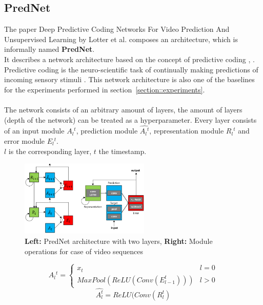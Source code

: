  \subsection{PredNet}
  The paper \glqq Deep Predictive Coding Networks For Video Prediction And Unsupervised Learning\grqq{} by Lotter et al. \cite{Lotter2016} composes an architecture, which is informally named
  \textbf{PredNet}.\\
  It describes a network architecture based on the concept of \glqq predictive coding\grqq{} \cite{Rao1999}, \cite{Friston2005}.
  Predictive coding is the neuro-scientific task of \glqq continually making predictions of incoming sensory stimuli\grqq{} \cite{Lotter2016}.
  This network architecture is also one of the baselines for the experiments performed in section~\ref{section::experiments}.
  \\\\  
  The network consists of an arbitrary amount of layers, the amount of layers (depth of the network) can be treated as a hyperparameter. Every layer consists
  of an input module $A{_l}^t$, prediction module $\hat{A{_l}^t}$, representation module $R{_l}^t$ and error module $E{_l}^t$.\\
  $l$ is the corresponding layer, $t$ the timestamp.
  \begin{figure}[H]
   \includegraphics[width=0.55\textwidth]{../Images/lotter.png}
   \centering
   \caption{\textbf{Left:} PredNet architecture with two layers, \textbf{Right:} \glqq Module operations for case of video sequences\grqq{} \cite{Lotter2016}}
   \label{fig:lotter_architecture}
  \end{figure}
  \begin{equation}
   A{_l}^t = \begin{cases} x_t & l = 0 \\ MaxPool(ReLU(Conv(E_{l-1}^t))) & l > 0 \end{cases}
  \end{equation}
  \begin{equation}
   \hat{A_l^t} = ReLU(Conv(R_l^t)
  \end{equation}
